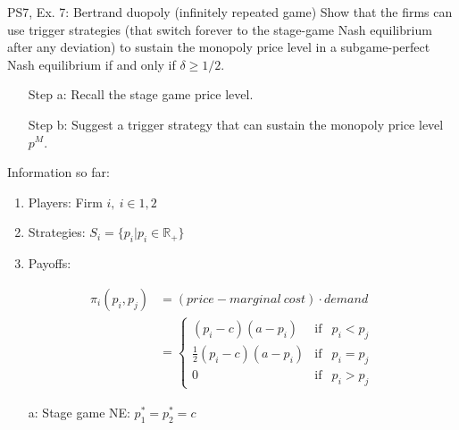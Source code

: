 \begin{frame}{PS7, Ex. 7: Bertrand duopoly (infinitely repeated game)}
    Show that the firms can use trigger strategies (that switch forever to the stage-game Nash equilibrium after any deviation) to sustain the monopoly price level in a subgame-perfect Nash equilibrium if and only if $\delta\geq1/2$.
    \vspace{-6pt}
    \begin{multicols}{2}
      \begin{itemize}
        \item[Step a:] Recall the stage game price level.
        \item[Step b:] Suggest a trigger strategy that can sustain the monopoly price level $p^M$.
      \end{itemize}
      \vspace{-4pt}
      \vfill\null\columnbreak
      Information so far:
      \vspace{-4pt}
      \begin{enumerate}
        \item Players: Firm $i,\ i\in1,2$
        \item Strategies: $S_i=\{p_i|p_i\in\mathbb{R}_+\}$
        \item Payoffs:
      \end{enumerate}
      \vspace{-12pt}
      \begin{align*}
        \pi_i(p_i,p_j)&=(price-marginal\ cost)\cdot demand\\
                      &=\left\{\begin{array}{lcl}
          (p_i-c)(a-p_i)            & \text{if} & p_i<p_j\\
          \frac{1}{2}(p_i-c)(a-p_i) & \text{if} & p_i=p_j\\
          0                         & \text{if} & p_i>p_j
        \end{array}\right.
      \end{align*}
      \vspace{-16pt}
      \begin{itemize}
        \item[a:] Stage game NE: $p_1^*=p_2^*=c$
      \end{itemize}
      \vfill\null
    \end{multicols}
\end{frame}
